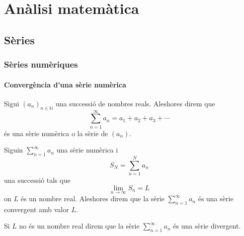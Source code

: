 \documentclass[../../Main.tex]{subfiles}
\begin{document}
\part{Anàlisi matemàtica}
\chapter{Sèries}
\section{Sèries numèriques}
	\subsection{Convergència d'una sèrie numèrica}
	\begin{definition}
		\label{def:sèrie numèrica}
		Sigui \((a_{n})_{n\in\mathbb{N}}\) una successió de nombres reals. Aleshores direm que
		\[\sum_{n=1}^{\infty}a_{n}=a_{1}+a_{2}+a_{3}+\cdots\]
		és una sèrie numèrica o la sèrie de \((a_{n})\).
	\end{definition}
	\begin{definition}
		\label{def:sèrie convergent}
		\label{def:sèrie divergent}
		Siguin \(\sum_{n=1}^{\infty}a_{n}\) una sèrie numèrica i
		\[S_{N}=\sum_{n=1}^{N}a_{n}\]
		una successió tals que
		\[\lim_{n\to\infty}S_{n}=L\]
		on \(L\) és un nombre real. Aleshores direm que la sèrie \(\sum_{n=1}^{\infty}a_{n}\) és una sèrie convergent amb valor \(L\).
		
		Si \(L\) no és un nombre real direm que la sèrie \(\sum_{n=1}^{\infty}a_{n}\) és una sèrie divergent.
	\end{definition}
\end{document}
